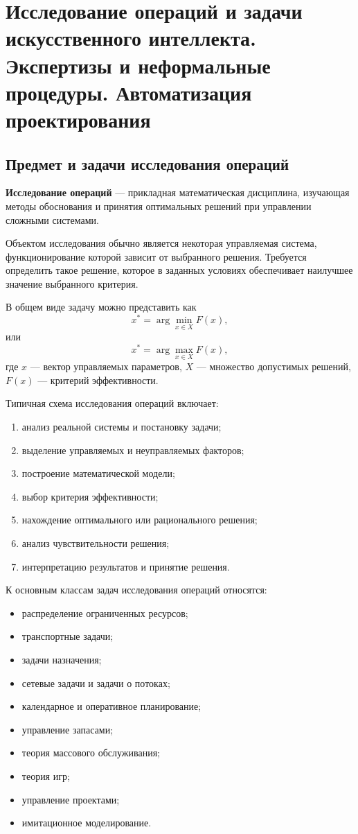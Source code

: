 \section{Исследование операций и задачи искусственного интеллекта. Экспертизы и неформальные процедуры. Автоматизация проектирования}

\subsection{Предмет и задачи исследования операций}

\textbf{Исследование операций} --- прикладная математическая дисциплина, изучающая методы обоснования и принятия оптимальных решений при управлении сложными системами.

Объектом исследования обычно является некоторая управляемая система, функционирование которой зависит от выбранного решения. Требуется определить такое решение, которое в заданных условиях обеспечивает наилучшее значение выбранного критерия.

В общем виде задачу можно представить как
\[
x^* = \arg\min_{x\in X} F(x),
\]
или
\[
x^* = \arg\max_{x\in X} F(x),
\]
где $x$ --- вектор управляемых параметров, $X$ --- множество допустимых решений, $F(x)$ --- критерий эффективности.

Типичная схема исследования операций включает:
\begin{enumerate}
	\item анализ реальной системы и постановку задачи;
	\item выделение управляемых и неуправляемых факторов;
	\item построение математической модели;
	\item выбор критерия эффективности;
	\item нахождение оптимального или рационального решения;
	\item анализ чувствительности решения;
	\item интерпретацию результатов и принятие решения.
\end{enumerate}

К основным классам задач исследования операций относятся:
\begin{itemize}
	\item распределение ограниченных ресурсов;
	\item транспортные задачи;
	\item задачи назначения;
	\item сетевые задачи и задачи о потоках;
	\item календарное и оперативное планирование;
	\item управление запасами;
	\item теория массового обслуживания;
	\item теория игр;
	\item управление проектами;
	\item имитационное моделирование.
\end{itemize}

